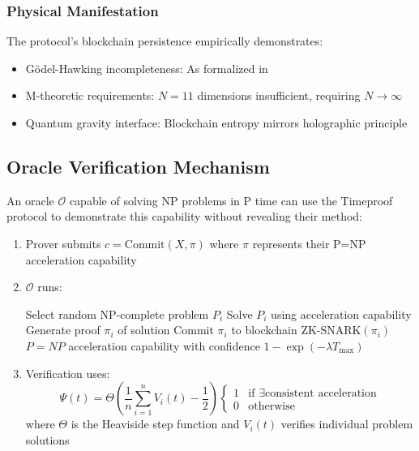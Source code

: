 \documentclass[12pt]{report}
\begin{document}
\subsubsection{Physical Manifestation}
The protocol's blockchain persistence empirically demonstrates:
\begin{itemize}
    \item Gödel-Hawking incompleteness: As formalized in \cite{Hawking2002}
    \item M-theoretic requirements: $N=11$ dimensions insufficient, requiring $N\rightarrow\infty$
    \item Quantum gravity interface: Blockchain entropy mirrors holographic principle
\end{itemize}

\subsection{Oracle Verification Mechanism}
An oracle $\mathcal{O}$ capable of solving NP problems in P time can use the Timeproof protocol to demonstrate this capability without revealing their method:
\begin{enumerate}
    \item Prover submits $c = \text{Commit}(X, \pi)$ where $\pi$ represents their P=NP acceleration capability
    \item $\mathcal{O}$ runs:
    \begin{algorithmic}[1]
            \State Select random NP-complete problem $P_i$
            \State Solve $P_i$ using acceleration capability
            \State Generate proof $\pi_i$ of solution
            \State Commit $\pi_i$ to blockchain
            \State \Return $\text{ZK-SNARK}(\pi_i)$ 
        \EndWhile
        \State \Return $P = NP$ acceleration capability with confidence $1-\exp(-\lambda T_{\text{max}})$
    \end{algorithmic}
    \item Verification uses:
    \begin{equation}
        \Psi(t) = \Theta\left(\frac{1}{n}\sum_{i=1}^n V_i(t) - \frac{1}{2}\right)\begin{cases}
            1 & \text{if } \exists \text{consistent acceleration} \\
            0 & \text{otherwise}
        \end{cases}
    \end{equation}
    where $\Theta$ is the Heaviside step function and $V_i(t)$ verifies individual problem solutions
\end{enumerate}
\end{document}
